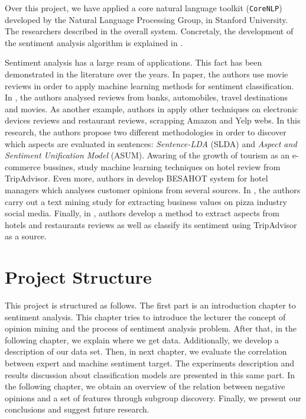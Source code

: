 \documentclass[a4paper,10pt]{book}
\begin{document}
	Over this project, we have applied a core natural language toolkit (\texttt{CoreNLP}) developed by the Natural Language Processing Group, in Stanford University. The researchers described in \cite{manning2014stanford} the overall system. Concretaly, the development of the sentiment analysis algorithm is explained in \cite{socher2013recursive}. 
	
	Sentiment analysis has a large ream of applications. This fact has been demonstrated in the literature over the years. In \cite{pang2002thumbs} paper, the authors use movie reviews in order to apply machine learning methods for sentiment classification.  In \cite{turney2002thumbs}, the authors analysed reviews from banks, automobiles, travel destinations and movies.  As another example, authors in \cite{jo2011aspect} apply other techniques on electronic devices reviews and restaurant reviews, scrapping Amazon and Yelp webs. In this research, the authors propose two different methodologies in order to discover which aspects are evaluated in sentences: \textit{Sentence-LDA} (SLDA) and \textit{Aspect and Sentiment Unification Model} (ASUM). Awaring of the growth of tourism as an e-commerce bussines, \cite{elangosentiment} study machine learning techniques on hotel review from TripAdvisor. Even more, authors in \cite{kasper2011sentiment} develop BESAHOT system for hotel managers which analyses customer opinions from several sources.  In \cite{he2013social}, the authors carry out a text mining study for extracting business values on pizza industry social media. Finally, in \cite{marrese2013identifying}, authors develop a method to extract aspects from hotels and restaurants reviews as well as classify its sentiment using TripAdvisor as a source.
	
	

  
  \section{Project Structure} \label{sec:structure}
 
This project is structured as follows. The first part is an introduction chapter to sentiment analysis. This chapter tries to introduce the lecturer the concept of opinion mining and the process of sentiment analysis problem. 
After that, in the following chapter, we explain where we get data. Additionally, we develop a description of our data set. 
Then, in next chapter, we evaluate the correlation between expert and machine sentiment target. The experiments description and results discussion about classification models are presented in this same part. 
In the following chapter, we obtain an overview of the relation between negative opinions and a set of features through subgroup discovery. Finally, we present our conclusions and suggest future research.
\end{document}
